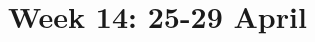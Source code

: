 \documentclass[cal1spr16Lectures.tex]{subfiles}
\begin{document}
\section[Week 14]{Week 14: 25-29 April}



\end{document}
